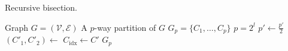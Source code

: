 \begin{algorithm}
    \caption{Recursive bisection.}
    \label{alg:recursive}
    \begin{algorithmic}[1]
        \Require Graph \( G = (\mathcal{V}, \mathcal{E}) \)
    \Ensure A $p$-way partition of \( G \)
    \State \(G_p = \{C_1,\dots, C_p\}\)
    \State \(p = 2^l\)
                \State \(p' \leftarrow \frac{p'}{2}\)
                \State \(\left(C'_1, C'_2\right)\leftarrow \)
                \State {}
                \State {}
            \Else
                \State \(C_{\mathrm{idx}} \leftarrow C'\)
            \EndIf
        \EndFunction
         \State {}
         \State \Return \(G_p\)
    \EndFunction
    \end{algorithmic}
\end{algorithm}